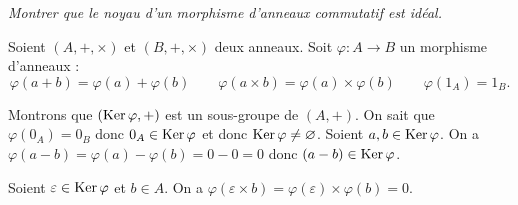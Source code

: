 \begin{exo}
	{\it Montrer que le noyau d'un morphisme d'anneaux commutatif est idéal.}

	Soient $(A, +, \times)$\/ et $(B, +, \times)$\/ deux anneaux.
	Soit $\varphi : A \to B$\/ un morphisme d'anneaux : 
	\[
		\varphi(a+b) = \varphi(a) + \varphi(b) \qquad \varphi(a \times b) = \varphi(a) \times \varphi(b) \qquad \varphi(1_A) = 1_B
	.\]

	Montrons que $(\operatorname{Ker} \varphi, +)$\/ est un sous-groupe de $(A, +)$.
	On sait que $\varphi(0_A) = 0_B$\/ donc $0_A \in \operatorname{Ker} \varphi$\/ et donc $\operatorname{Ker} \varphi \neq \varnothing$.
	Soient $a,b \in \operatorname{Ker} \varphi$. On a $\varphi(a-b) = \varphi(a) - \varphi(b) = 0 - 0 = 0$ donc $(a-b) \in \operatorname{Ker} \varphi$.

	Soient $\varepsilon \in \operatorname{Ker} \varphi$\/ et $b \in A$. On a $\varphi(\varepsilon \times b) = \varphi(\varepsilon) \times \varphi(b) = 0$.
\end{exo}
